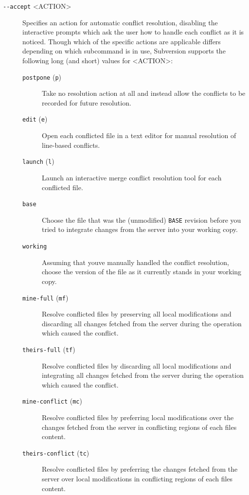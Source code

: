 \begin{description}
\item[\protect{}\label{svn.ref.svn.sw.accept}{}\texttt{-\/-accept}
\textless ACTION\textgreater{}]
Specifies an action for automatic conflict resolution, disabling the
interactive prompts which ask the user how to handle each conflict as it
is noticed. Though which of the specific actions are applicable differs
depending on which subcommand is in use, Subversion supports the
following long (and short) values for \textless ACTION\textgreater:

\begin{description}
\item[\texttt{postpone} (\texttt{p})]
Take no resolution action at all and instead allow the conflicts to be
recorded for future resolution.
\item[\texttt{edit} (\texttt{e})]
Open each conflicted file in a text editor for manual resolution of
line-based conflicts.
\item[\texttt{launch} (\texttt{l})]
Launch an interactive merge conflict resolution tool for each conflicted
file.
\item[\texttt{base}]
Choose the file that was the (unmodified) \texttt{BASE} revision before
you tried to integrate changes from the server into your working copy.
\item[\texttt{working}]
Assuming that you\textquotesingle ve manually handled the conflict
resolution, choose the version of the file as it currently stands in
your working copy.
\item[\texttt{mine-full} (\texttt{mf})]
Resolve conflicted files by preserving all local modifications and
discarding all changes fetched from the server during the operation
which caused the conflict.
\item[\texttt{theirs-full} (\texttt{tf})]
Resolve conflicted files by discarding all local modifications and
integrating all changes fetched from the server during the operation
which caused the conflict.
\item[\texttt{mine-conflict} (\texttt{mc})]
Resolve conflicted files by preferring local modifications over the
changes fetched from the server in conflicting regions of each
file\textquotesingle s content.
\item[\texttt{theirs-conflict} (\texttt{tc})]
Resolve conflicted files by preferring the changes fetched from the
server over local modifications in conflicting regions of each
file\textquotesingle s content.
\end{description}


\end{description}
